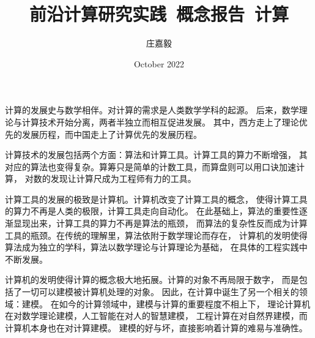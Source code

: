 \documentclass{ctexart}
\title{前沿计算研究实践~概念报告~计算}
\author{庄嘉毅}
\date{October 2022}
\begin{document}
\maketitle

计算的发展史与数学相伴。对计算的需求是人类数学学科的起源。
后来，数学理论与计算技术开始分离，两者半独立而相互促进发展。
其中，西方走上了理论优先的发展历程，而中国走上了计算优先的发展历程。

计算技术的发展包括两个方面：算法和计算工具。计算工具的算力不断增强，
其对应的算法也变得复杂。算筹只是简单的计数工具，而算盘则可以用口诀加速计算，
对数的发现让计算尺成为工程师有力的工具。

计算工具的发展的极致是计算机。计算机改变了计算工具的概念，
使得计算工具的算力不再是人类的极限，计算工具走向自动化。
在此基础上，算法的重要性逐渐显现出来，计算工具的算力不再是算法的瓶颈，
而算法的复杂性反而成为计算工具的瓶颈。在传统的理解里，算法依附于数学理论而存在，
计算机的发明使得算法成为独立的学科，算法以数学理论与计算理论为基础，
在具体的工程实践中不断发展。

计算机的发明使得计算的概念极大地拓展。计算的对象不再局限于数字，
而是包括了一切可以建模被计算机处理的对象。
因此，在计算中诞生了另一个相关的领域：建模。
在如今的计算领域中，建模与计算的重要程度不相上下，
理论计算机在对数学理论建模，人工智能在对人的智慧建模，
工程计算在对自然界建模，而计算机本身也在对计算建模。
建模的好与坏，直接影响着计算的难易与准确性。
\end{document}
